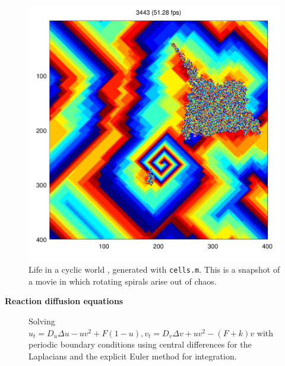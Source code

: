 \documentclass{beamer}
\def\sect#1{\textbf{\color{blue} #1}}
\begin{document}
\begin{frame}[t]{}
\begin{multicols}{5}
\begin{figure}
\includegraphics[width=0.75\hsize]{cells.png}
\caption{Life in a cyclic world \cite{cca}, generated with \texttt{cells.m}.
This is a snapshot of a movie in which rotating spirals arise out of chaos.
}
\end{figure}

\columnbreak

\sect{Reaction diffusion equations}

\begin{figure}
\caption{Solving $u_t = D_u \Delta u - uv^2 + F(1-u), v_t = D_v \Delta v + uv^2 - (F+k) v$
with periodic boundary conditions using central differences for the
Laplacians and the explicit Euler method 
for integration.}


\end{figure}
\end{multicols}
\end{frame}
\end{document}
